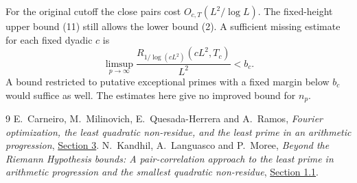 \documentclass[11pt]{article}
\begin{document}
For the original cutoff the close pairs cost $O_{c,T}(L^2/\log L)$.
The fixed-height upper bound (11) still allows the lower bound (2).
A sufficient missing estimate for each fixed dyadic $c$ is
\[
 \limsup_{p\to\infty}
 \frac{R_{1/\log(cL^2)}(cL^2,T_c)}{L^2}<b_c .
\]
A bound restricted to putative exceptional primes with a fixed margin
below $b_c$ would suffice as well. The estimates here give no improved
bound for $n_p$.

\begin{thebibliography}{9}
 E.~Carneiro, M.~Milinovich, E.~Quesada-Herrera and A.~Ramos,
\emph{Fourier optimization, the least quadratic non-residue, and the
least prime in an arithmetic progression},
\href{https://arxiv.org/html/2404.08380v2#S3}{Section 3}.
 N.~Kandhil, A.~Languasco and P.~Moree,
\emph{Beyond the Riemann Hypothesis bounds: A pair-correlation approach
to the least prime in arithmetic progression and the smallest quadratic
non-residue}, \href{https://arxiv.org/html/2607.14515v1#S1.SS1}{Section 1.1}.
\end{thebibliography}
\end{document}
